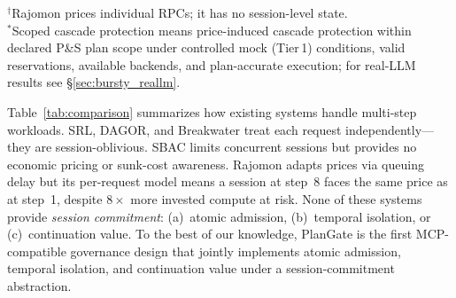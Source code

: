\documentclass[sigconf,review,anonymous]{acmart}
\begin{document}
\begin{table}[t]
\caption{Comparison of overload control approaches for multi-step workloads. \emph{Session Aware} = tracks cross-request state; \emph{Atomic Admit} = whole-plan admission; \emph{Temporal Isol.} = admitted sessions shielded from price volatility; \emph{Continuation Val.} = progress-dependent effective cost reduction.}
\label{tab:comparison}
\small
{}
\vspace{-0.3em}
{\footnotesize $^\dagger$Rajomon prices individual RPCs; it has no session-level state.\\
$^*$Scoped cascade protection means price-induced cascade protection within declared P\&S plan scope under controlled mock (Tier\,1) conditions, valid reservations, available backends, and plan-accurate execution; for real-LLM results see \S\ref{sec:bursty_reallm}.}
\end{table}

Table~\ref{tab:comparison} summarizes how existing systems handle multi-step workloads. SRL, DAGOR, and Breakwater treat each request independently---they are session-oblivious. SBAC limits concurrent sessions but provides no economic pricing or sunk-cost awareness. Rajomon adapts prices via queuing delay but its per-request model means a session at step~8 faces the same price as at step~1, despite $8\times$ more invested compute at risk. None of these systems provide \emph{session commitment}: (a)~atomic admission, (b)~temporal isolation, or (c)~continuation value. To the best of our knowledge, PlanGate is the first MCP-compatible governance design that jointly implements atomic admission, temporal isolation, and continuation value under a session-commitment abstraction.
\end{document}
